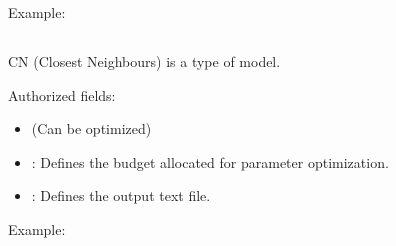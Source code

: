 \documentclass[letterpaper,10pt,english]{sphinxmanual}
\begin{document}
\begin{DUlineblock}{0em}
\item[] Example:
\item[] 
\item[] 
\item[] 
\end{DUlineblock}


\subsection{}
\label{\detokenize{SgteLib:cn}}\label{\detokenize{SgteLib:id9}}
\begin{DUlineblock}{0em}
\item[] CN (Closest Neighbours) is a type of model.
\item[] Authorized fields:
\end{DUlineblock}
\begin{itemize}
\item {} 
\sphinxAtStartPar
{\hyperref[\detokenize{SgteLib:distance-type}]{}} (Can be optimized)

\item {} 
\sphinxAtStartPar
{\hyperref[\detokenize{SgteLib:budget}]{}}: Defines the budget allocated for parameter optimization.

\item {} 
\sphinxAtStartPar
{\hyperref[\detokenize{SgteLib:output}]{}}: Defines the output text file.

\end{itemize}

\begin{DUlineblock}{0em}
\item[] Example:
\item[] 
\end{DUlineblock}
\end{document}
